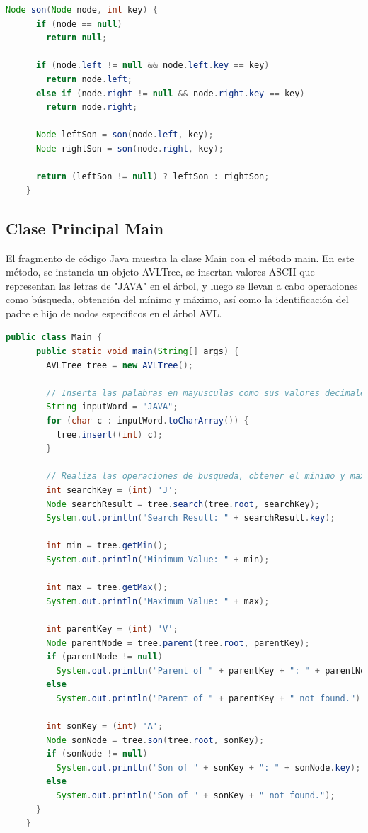 \documentclass{article}
\begin{document}
  \begin{lstlisting}[language=Java, caption={Ejemplo de código Java}]
    Node son(Node node, int key) {
      if (node == null)
        return null;

      if (node.left != null && node.left.key == key)
        return node.left;
      else if (node.right != null && node.right.key == key)
        return node.right;

      Node leftSon = son(node.left, key);
      Node rightSon = son(node.right, key);

      return (leftSon != null) ? leftSon : rightSon;
    }
  \end{lstlisting}
  \subsection{Clase Principal Main}
  El fragmento de código Java muestra la clase Main con el método main. En este método, se instancia un objeto AVLTree, 
  se insertan valores ASCII que representan las letras de "JAVA" en el árbol, y luego se llevan a cabo operaciones como 
  búsqueda, obtención del mínimo y máximo, así como la identificación del padre e hijo de nodos específicos en el árbol AVL.
  
  \begin{lstlisting}[language=Java, caption={Ejemplo de código Java}]
    public class Main {
      public static void main(String[] args) {
        AVLTree tree = new AVLTree();

        // Inserta las palabras en mayusculas como sus valores decimales de ASCII
        String inputWord = "JAVA";
        for (char c : inputWord.toCharArray()) {
          tree.insert((int) c);
        }
        
        // Realiza las operaciones de busqueda, obtener el minimo y maximo, el padre y el hijo
        int searchKey = (int) 'J';
        Node searchResult = tree.search(tree.root, searchKey);
        System.out.println("Search Result: " + searchResult.key);

        int min = tree.getMin();
        System.out.println("Minimum Value: " + min);

        int max = tree.getMax();
        System.out.println("Maximum Value: " + max);

        int parentKey = (int) 'V';
        Node parentNode = tree.parent(tree.root, parentKey);
        if (parentNode != null)
          System.out.println("Parent of " + parentKey + ": " + parentNode.key);
        else
          System.out.println("Parent of " + parentKey + " not found.");

        int sonKey = (int) 'A';
        Node sonNode = tree.son(tree.root, sonKey);
        if (sonNode != null)
          System.out.println("Son of " + sonKey + ": " + sonNode.key);
        else
          System.out.println("Son of " + sonKey + " not found.");
      }
    }
  \end{lstlisting}
  
\end{document}

